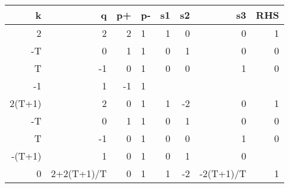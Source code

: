 \begin{table}[ht]
    \begin{tabular}{rrrlrrrr}
        k      & q          & p+ & p- & s1                                                         & s2                                                         & s3                                                         & RHS       \\ \hline
        2      & 2          & 2  & 1  & 1                                                          & 0                                                          & 0                                                          & 1         \\
        -T     & 0          & 1  & 1  & 0                                                          & 1                                                          & 0                                                          & 0         \\
        T      & -1         & 0  & 1  & 0                                                          & 0                                                          & 1                                                          & 0         \\
        -1     & 1          & -1 & 1  &                                                            &                                                            &                                                            &           \\ \hline
        2(T+1) & 2          & 0  & 1  & 1                                                          & -2                                                         & 0                                                          & 1         \\ \hline
        -T     & 0          & 1  & 1  & 0                                                          & 1                                                          & 0                                                          & 0         \\
        T      & -1         & 0  & 1  & 0                                                          & 0                                                          & 1                                                          & 0         \\
        -(T+1) & 1          & 0  & 1  & 0                                                          & 1                                                          & 0                                                          &           \\ \hline
        0      & 2+2(T+1)/T & 0  & 1  & 1                                                          & -2                                                         & -2(T+1)/T                                                  & 1         \\ \hline

\end{tabular}
\end{table}
